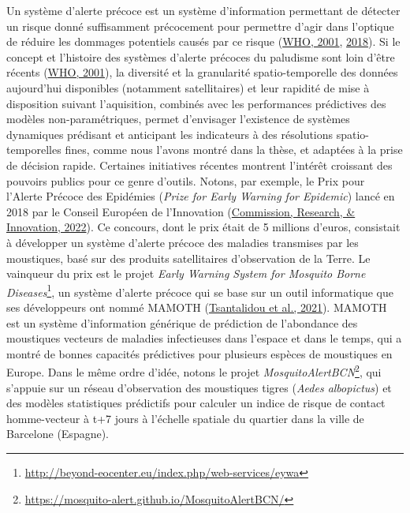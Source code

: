\documentclass[12pt,twoside]{reedthesis}
\begin{document}
Un système d'alerte précoce est un système d'information permettant de détecter un risque donné suffisamment précocement pour permettre d'agir dans l'optique de réduire les dommages potentiels causés par ce risque (\protect\hyperlink{ref-malaria_framework_2001}{WHO, 2001}, \protect\hyperlink{ref-who_malaria_surveillance}{2018}). Si le concept et l'histoire des systèmes d'alerte précoces du paludisme sont loin d'être récents (\protect\hyperlink{ref-malaria_framework_2001}{WHO, 2001}), la diversité et la granularité spatio-temporelle des données aujourd'hui disponibles (notamment satellitaires) et leur rapidité de mise à disposition suivant l'aquisition, combinés avec les performances prédictives des modèles non-paramétriques, permet d'envisager l'existence de systèmes dynamiques prédisant et anticipant les indicateurs à des résolutions spatio-temporelles fines, comme nous l'avons montré dans la thèse, et adaptées à la prise de décision rapide. Certaines initiatives récentes montrent l'intérêt croissant des pouvoirs publics pour ce genre d'outils. Notons, par exemple, le Prix pour l'Alerte Précoce des Epidémies (\emph{Prize for Early Warning for Epidemic}) lancé en 2018 par le Conseil Européen de l'Innovation (\protect\hyperlink{ref-eic_early_warning}{Commission, Research, \& Innovation, 2022}). Ce concours, dont le prix était de 5 millions d'euros, consistait à développer un système d'alerte précoce des maladies transmises par les moustiques, basé sur des produits satellitaires d'observation de la Terre. Le vainqueur du prix est le projet \emph{Early Warning System for Mosquito Borne Diseases}\footnote{\url{http://beyond-eocenter.eu/index.php/web-services/eywa}}, un système d'alerte précoce qui se base sur un outil informatique que ses développeurs ont nommé MAMOTH (\protect\hyperlink{ref-tsantalidou_mamoth_2021}{Tsantalidou et al., 2021}). MAMOTH est un système d'information générique de prédiction de l'abondance des moustiques vecteurs de maladies infectieuses dans l'espace et dans le temps, qui a montré de bonnes capacités prédictives pour plusieurs espèces de moustiques en Europe. Dans le même ordre d'idée, notons le projet \emph{MosquitoAlertBCN}\footnote{\url{https://mosquito-alert.github.io/MosquitoAlertBCN/}}, qui s'appuie sur un réseau d'observation des moustiques tigres (\emph{Aedes albopictus}) et des modèles statistiques prédictifs pour calculer un indice de risque de contact homme-vecteur à t+7 jours à l'échelle spatiale du quartier dans la ville de Barcelone (Espagne).\\
\end{document}
